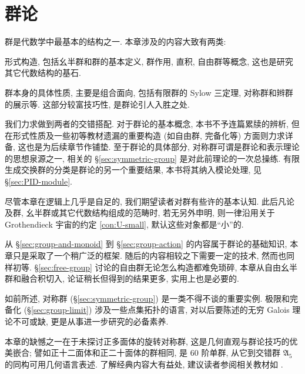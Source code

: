 
\chapter{群论}
群是代数学中最基本的结构之一. 本章涉及的内容大致有两类:
\begin{compactenum}
	\item 形式构造, 包括幺半群和群的基本定义, 群作用, 直积, 自由群等概念, 这也是研究其它代数结构的基石.
	\item 群本身的具体性质, 主要是组合面向, 包括有限群的 Sylow 三定理, 对称群和辫群的展示等. 这部分较富技巧性, 是群论引人入胜之处.
\end{compactenum}
我们力求做到两者的交错搭配. 对于群论的基本概念, 本书不予连篇累牍的辨析, 但在形式性质及一些初等教材遗漏的重要构造 (如自由群, 完备化等) 方面则力求详备, 这也是为后续章节作铺垫. 至于群论的具体部分, 对称群可谓是群论和表示理论的思想泉源之一, 相关的 \S\ref{sec:symmetric-group} 是对此前理论的一次总操练. 有限生成交换群的分类是群论的另一个重要结果, 本书将其纳入模论处理, 见 \S\ref{sec:PID-module}.

尽管本章在逻辑上几乎是自足的, 我们期望读者对群有些许的基本认知. 此后凡论及群, 幺半群或其它代数结构组成的范畴时, 若无另外申明, 则一律沿用关于 Grothendieck 宇宙的约定 \ref{con:U-small}, 默认这些对象都是``小''的.

\begin{wenxintishi}
	从 \S\ref{sec:group-and-monoid} 到 \S\ref{sec:group-action} 的内容属于群论的基础知识, 本章只是采取了一个稍广泛的框架. 随后的内容相较之下需要一定的技术, 然而也同样初等. \S\ref{sec:free-group} 讨论的自由群无论怎么构造都难免琐碎, 本章从自由幺半群和融合积切入, 论证稍长但得到的结果更多, 实用上也是必要的.

	如前所述, 对称群 (\S\ref{sec:symmetric-group}) 是一类不得不谈的重要实例. 极限和完备化 (\S\ref{sec:group-limit}) 涉及一些点集拓扑的语言, 对以后要陈述的无穷 Galois 理论不可或缺, 更是从事进一步研究的必备素养.

	本章的缺憾之一在于未探讨正多面体的旋转对称群, 这是几何直观与群论技巧的优美嵌合; 譬如正十二面体和正二十面体的群相同, 是 $60$ 阶单群, 从它到交错群 $\mathfrak{A}_5$ 的同构可用几何语言表述. 了解经典内容大有益处, 建议读者参阅相关教材如 \cite[Chapter 8]{Har00}.
\end{wenxintishi}

